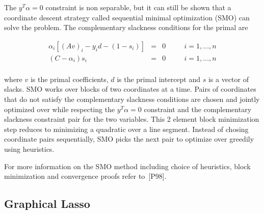\documentclass[twoside]{article}
\renewcommand{\cite}[1]{[#1]}
\begin{document}
The $y^T\alpha = 0$ constraint is non separable, but it can still be shown that a coordinate descent strategy called sequential minimal optimization (SMO) can solve the problem. The complementary slackness conditions for the primal are

\begin{equation*}
\begin{aligned}
\alpha_i[(Av)_i - y_id - (1-s_i)] &=& 0 & \quad & i=1,...,n \\
(C-\alpha_i)s_i                   &=& 0 & \quad & i=1,...,n \\
\end{aligned}
\end{equation*}

where $v$ is the primal coefficients, $d$ is the primal intercept and $s$ is a vector of slacks. SMO works over blocks of two coordinates at a time. Pairs of coordinates that do not satisfy the complementary slackness conditions are chosen and jointly optimized over while respecting the $y^T\alpha = 0$ constraint and the complementary slackness constraint pair for the two variables. This 2 element block minimization step reduces to minimizing a quadratic over a line segment. Instead of chosing coordinate pairs sequentially, SMO picks the next pair to optimize over greedily using heuristics.

For more information on the SMO method including choice of heuristics, block minimization and convergence proofs refer to~\cite{P98}. 

\subsection{Graphical Lasso}
\end{document}
